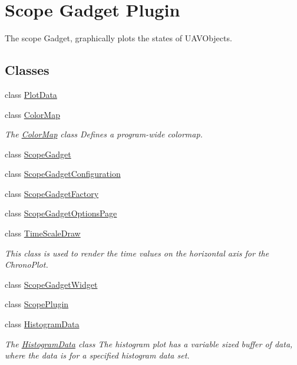 \hypertarget{group___scope_plugin}{\section{\-Scope \-Gadget \-Plugin}
\label{group___scope_plugin}
}


\-The scope \-Gadget, graphically plots the states of \-U\-A\-V\-Objects.  


\subsection*{\-Classes}
\begin{DoxyCompactItemize}
\item 
class \hyperlink{class_plot_data}{\-Plot\-Data}
\item 
class \hyperlink{class_color_map}{\-Color\-Map}
\begin{DoxyCompactList}\small\item\em \-The \hyperlink{class_color_map}{\-Color\-Map} class \-Defines a program-\/wide colormap. \end{DoxyCompactList}\item 
class \hyperlink{class_scope_gadget}{\-Scope\-Gadget}
\item 
class \hyperlink{class_scope_gadget_configuration}{\-Scope\-Gadget\-Configuration}
\item 
class \hyperlink{class_scope_gadget_factory}{\-Scope\-Gadget\-Factory}
\item 
class \hyperlink{class_scope_gadget_options_page}{\-Scope\-Gadget\-Options\-Page}
\item 
class \hyperlink{class_time_scale_draw}{\-Time\-Scale\-Draw}
\begin{DoxyCompactList}\small\item\em \-This class is used to render the time values on the horizontal axis for the \-Chrono\-Plot. \end{DoxyCompactList}\item 
class \hyperlink{class_scope_gadget_widget}{\-Scope\-Gadget\-Widget}
\item 
class \hyperlink{class_scope_plugin}{\-Scope\-Plugin}
\item 
class \hyperlink{class_histogram_data}{\-Histogram\-Data}
\begin{DoxyCompactList}\small\item\em \-The \hyperlink{class_histogram_data}{\-Histogram\-Data} class \-The histogram plot has a variable sized buffer of data, where the data is for a specified histogram data set. \end{DoxyCompactList}\item 

\end{DoxyCompactItemize}
